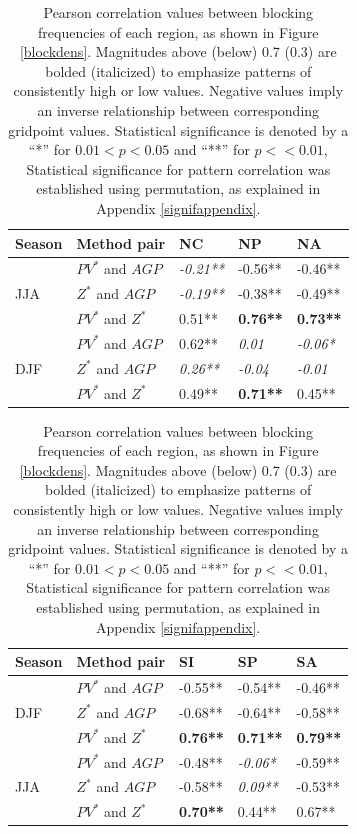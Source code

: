 \documentclass[smallextended]{svjour3}       %
\numberwithin{equation}{section}
\begin{document}
\begin{table}
\centering
\caption{Pearson correlation values between blocking frequencies of each region, as shown in Figure \ref{blockdens}. Magnitudes above (below) 0.7 (0.3) are bolded (italicized) to emphasize patterns of consistently high or low values. Negative values imply an inverse relationship between corresponding gridpoint values. Statistical significance is denoted by a ``*'' for $0.01<p<0.05$ and ``**'' for $p<<0.01$, Statistical significance for pattern correlation was established using permutation, as explained in Appendix \ref{signifappendix}. }
\label{pearsontabcol}
\begin{tabular}{|l|l|l|l|l|}
\hline
 Season & Method pair & NC    & NP    & NA   \\ \hline
\multirow{3}{*}{JJA} 
   & $PV^* $ and $AGP$  & \textit{-0.21**} & -0.56** & -0.46** \\ 
   & $Z^*$ and $AGP$  & \textit{-0.19**} & -0.38** & -0.49** \\  
   & $PV^*$ and $Z^*$  & 0.51** & \textbf{0.76**} & \textbf{0.73**} \\ 
   \hline
\multirow{3}{*}{DJF}
  & $PV^*$ and $AGP$ & 0.62** & \textit{0.01} &\textit{ -0.06*} \\  
  & $Z^*$ and $AGP$  & \textit{0.26**}& \textit{-0.04}& \textit{-0.01}  \\ 
  & $PV^*$ and $Z^*$  & 0.49** & \textbf{0.71**} & 0.45**  \\   \hline
\end{tabular}
\begin{tabular}{|l|l|l|l|l|}
\hline
 Season & Method pair &  SI    & SP    & SA    \\ \hline

\multirow{3}{*}{DJF}
  & $PV^*$ and $AGP$  & -0.55**&-0.54** & -0.46**\\  
  & $Z^*$ and $AGP$   & -0.68**& -0.64** & -0.58**\\ 
  & $PV^*$ and $Z^*$  & \textbf{0.76**} & \textbf{0.71**} & \textbf{0.79**} \\   \hline
  
  \multirow{3}{*}{JJA} 
   & $PV^* $ and $AGP$  & -0.48** & \textit{-0.06*} & -0.59**\\ 
   & $Z^*$ and $AGP$  & -0.58** & \textit{0.09**} & {-0.53**} \\  
   & $PV^*$ and $Z^*$  & \textbf{0.70**} & {0.44**} & {0.67**} \\ 
   \hline
\end{tabular}
\end{table}
\end{document}
